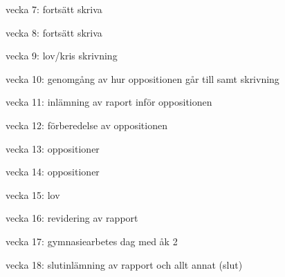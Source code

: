 vecka 7: fortsätt skriva

vecka 8: fortsätt skriva

vecka 9: lov/kris skrivning

vecka 10: genomgång av hur oppositionen går till samt skrivning

vecka 11: inlämning av raport inför oppositionen

vecka 12: förberedelse av oppositionen

vecka 13: oppositioner

vecka 14: oppositioner

vecka 15: lov

vecka 16: revidering av rapport

vecka 17: gymnasiearbetes dag med åk 2

vecka 18: slutinlämning av rapport och allt annat (slut)